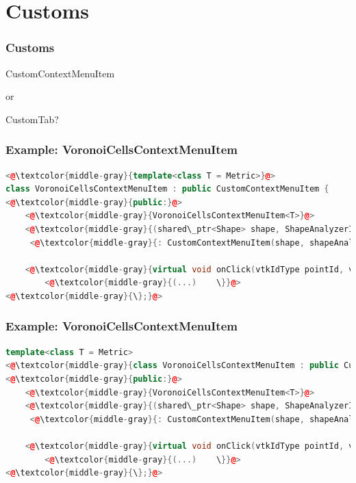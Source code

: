 \documentclass[compress]{beamer}
\begin{document}
\section{Customs}

\begin{frame}[c]
  \frametitle{Customs}
  \begin{center}
  
  \huge CustomContextMenuItem 
  
  \vspace{1em}
  
  or 
  
  \vspace{1em}
  
  CustomTab?
  \end{center}
\end{frame}

\begin{frame}[fragile]
  \frametitle{Example: VoronoiCellsContextMenuItem}
  
\begin{lstlisting}[language=C++, keywordstyle=\color{blue},
                stringstyle=\color{red},
                commentstyle=\color{green}, numbers=none]
<@\textcolor{middle-gray}{template<class T = Metric>}@>
class VoronoiCellsContextMenuItem : public CustomContextMenuItem {
<@\textcolor{middle-gray}{public:}@>
	<@\textcolor{middle-gray}{VoronoiCellsContextMenuItem<T>}@>
	<@\textcolor{middle-gray}{(shared\_ptr<Shape> shape, ShapeAnalyzerInterface* shapeAnalyzer)}@>
	 <@\textcolor{middle-gray}{: CustomContextMenuItem(shape, shapeAnalyzer) \{ \}}@>
    
    <@\textcolor{middle-gray}{virtual void onClick(vtkIdType pointId, vtkIdType faceId, QWidget* parent) \{}@>
        <@\textcolor{middle-gray}{(...)    \}}@>
<@\textcolor{middle-gray}{\};}@>
\end{lstlisting}
  
\end{frame}

\begin{frame}[fragile]
  \frametitle{Example: VoronoiCellsContextMenuItem}
  
\begin{lstlisting}[language=C++, keywordstyle=\color{blue},
                stringstyle=\color{red},
                commentstyle=\color{green}, numbers=none]
template<class T = Metric>
<@\textcolor{middle-gray}{class VoronoiCellsContextMenuItem : public CustomContextMenuItem \{}@>
<@\textcolor{middle-gray}{public:}@>
	<@\textcolor{middle-gray}{VoronoiCellsContextMenuItem<T>}@>
	<@\textcolor{middle-gray}{(shared\_ptr<Shape> shape, ShapeAnalyzerInterface* shapeAnalyzer)}@>
	 <@\textcolor{middle-gray}{: CustomContextMenuItem(shape, shapeAnalyzer) \{ \}}@>
    
    <@\textcolor{middle-gray}{virtual void onClick(vtkIdType pointId, vtkIdType faceId, QWidget* parent) \{}@>
        <@\textcolor{middle-gray}{(...)    \}}@>
<@\textcolor{middle-gray}{\};}@>
\end{lstlisting}
  
\end{frame}
\end{document}
